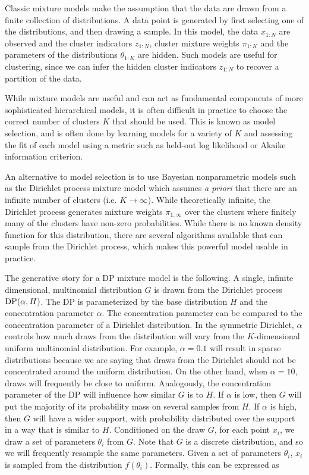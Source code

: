 Classic mixture models make the assumption that the data are drawn
from a finite collection of distributions. A data point is generated
by first selecting one of the distributions, and then drawing a
sample. In this model, the data $x_{1:N}$ are observed and the cluster
indicators $z_{1:N}$, cluster mixture weights $\pi_{1:K}$ and the
parameters of the distributions $\theta_{1:K}$ are hidden. Such models
are useful for clustering, since we can infer the hidden cluster
indicators $z_{1:N}$ to recover a partition of the data.

While mixture models are useful and can act as fundamental components
of more sophisticated hierarchical models, it is often difficult in
practice to choose the correct number of clusters $K$ that should be
used. This is known as model selection, and is often done by learning
models for a variety of $K$ and assessing the fit of each model using
a metric such as held-out log likelihood or Akaike information
criterion.

An alternative to model selection is to use Bayesian nonparametric
models such as the Dirichlet process mixture model \cite{antoniak1974}
which assumes \textit{a priori} that there are an infinite number of
clusters (i.e. $K \to \infty$). While theoretically infinite, the
Dirichlet process generates mixture weights $\pi_{1:\infty}$ over the
clusters where finitely many of the clusters have non-zero
probabilities. While there is no known density function for this
distribution, there are several algorithms available that can sample
from the Dirichlet process, which makes this powerful model usable in
practice.

The generative story for a DP mixture model is the following. A
single, infinite dimensional, multinomial distribution $G$ is drawn
from the Dirichlet process $\mathrm{DP}(\alpha, H)$. The DP is parameterized
by the base distribution $H$ and the concentration parameter
$\alpha$. The concentration parameter can be compared to the
concentration parameter of a Dirichlet distribution. In the symmetric
Dirichlet, $\alpha$ controls how much draws from the distribution will
vary from the $K$-dimensional uniform multinomial distribution. For
example, $\alpha = 0.1$ will result in sparse distributions because we
are saying that draws from the Dirichlet should not be concentrated
around the uniform distribution. On the other hand, when $\alpha =
10$, draws will frequently be close to uniform. Analogously, the
concentration parameter of the DP will influence how similar $G$ is to
$H$. If $\alpha$ is low, then $G$ will put the majority of its
probability mass on several samples from $H$. If $\alpha$ is high,
then $G$ will have a wider support, with probability distributed over
the support in a way that is similar to $H$. Conditioned on the draw
$G$, for each point $x_i$, we draw a set of parameters $\theta_i$ from
$G$. Note that $G$ is a discrete distribution, and so we will
frequently resample the same parameters. Given a set of parameters
$\theta_i$, $x_i$ is sampled from the distribution
$f(\theta_i)$. Formally, this can be expressed as

